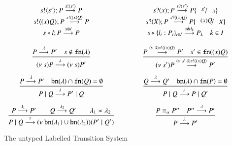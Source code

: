 \begin{figure}
	\[
	\begin{array}{ccc}
		\bout{s}{s'} P \by{\bactout{s}{s'}} P
		&\qquad&
		\binp{s}{x} P \by{\bactinp{s}{s'}} P\subst{s'}{x}
		\\
	

		\bout{s}{\abs{x}{Q}} P \by{\bactout{s}{\abs{x}{Q}}} P
		&\qquad&
		\binp{s}{X} P \by{\bactinp{s}{\abs{x}Q}} P\subst{\abs{x}Q}{X}
		\\

		\bsel{s}{l}{P} \by{\bactsel{s}{l}} P
		&&
		\bbra{s}{l_i:P_i}_{i \in I} \by{\bactbra{s}{l_k}} P_k \quad k \in I
		\\[4mm]

		\tree{
			P \by{\lambda} P' \quad s \notin \fn{\lambda}
		}{
			\news{s} P \by{\lambda} \news{s} P' 
		}
		&&
		\tree{
			P \by{\news{\tilde{s}} \bactout{s}{\abs{x} Q}} P' \quad s' \in \fn{\abs{x} Q}
		}{
			\news{s'} P \by{\news{s'\cat\tilde{s}} \bactout{s}{\abs{x} Q}} P'
		}
		\\[7mm]

		\tree{
			P \by{\lambda} P' \quad \bn{\lambda} \cap \fn{Q} = \es
		}{
			P \Par Q \by{\lambda} P' \Par Q
		}
		&&
		\tree{
			Q \by{\lambda} Q' \quad \bn{\lambda} \cap \fn{P} = \es
		}{
			P \Par Q \by{\lambda} P \Par Q'
		}
		\\[7mm]

		\tree{
			P \by{\lambda_1} P' \qquad Q \by{\lambda_2} Q' \qquad \lambda_1 \asymp \lambda_2
		}{
			P \Par Q \by{\tau} \newsp{\bn{\lambda_1} \cup \bn{\lambda_2}}{P' \Par Q'}
		}
		&&
		\tree{
			P \scong_\alpha P'' \quad P'' \by{\lambda} P'
		}{
			P \by{\lambda} P'
		}
	\end{array}
	\]
	\caption{The untyped Labelled Transition System \label{fig:untyped_LTS}}
\end{figure}
